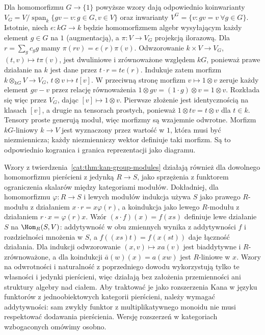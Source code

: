 \begin{przyklad}
Dla homomorfizmu $G\to\{1\}$ powyższe wzory dają odpowiednio koinwarianty $V_G=V/\operatorname{span}_k\{gv-v:g\in G,v\in V\}$ oraz inwarianty $V^G=\{v:gv=v\ \forall g\in G\}$. Istotnie, niech $e:kG\to k$ będzie homomorfizmem algebr wysyłającym każdy element $g\in G$ na $1$ (augmentacją), a $\pi:V\to V_G$ projekcją ilorazową. Dla $r=\sum_g c_g g$ mamy $\pi(rv)=e(r)\pi(v)$. Odwzorowanie $k\times V\to V_G$, $(t,v)\mapsto t\pi(v)$, jest dwuliniowe i zrównoważone względem $kG$, ponieważ prawe działanie na $k$ jest dane przez $t\cdot r=te(r)$. Indukuje zatem morfizm $k\otimes_{kG}V\to V_G$, $t\otimes v\mapsto t[v]$. W przeciwną stronę morfizm $v\mapsto1\otimes v$ zeruje każdy element $gv-v$ przez relację równoważenia $1\otimes gv=(1\cdot g)\otimes v=1\otimes v$. Rozkłada się więc przez $V_G$, dając $[v]\mapsto1\otimes v$. Pierwsze złożenie jest identycznością na klasach $[v]$, a drugie na tensorach prostych, ponieważ $1\otimes tv=t\otimes v$ dla $t\in k$. Tensory proste generują moduł, więc morfizmy są wzajemnie odwrotne. Morfizm $kG$-liniowy $k\to V$ jest wyznaczony przez wartość w $1$, która musi być niezmiennicza; każdy niezmienniczy wektor definiuje taki morfizm. Są to odpowiednio kogranica i granica reprezentacji jako diagramu.
\end{przyklad}
\begin{uwaga}
Wzory z twierdzenia~\ref{cat:thm:kan-group-modules} działają również dla dowolnego homomorfizmu pierścieni z jedynką $R\to S$, jako sprzężenia z funktorem ograniczenia skalarów między kategoriami modułów. Dokładniej, dla homomorfizmu $\varphi:R\to S$ i lewych modułów indukcja używa $S$ jako prawego $R$-modułu z działaniem $x\cdot r=x\varphi(r)$, a koindukcja jako lewego $R$-modułu z działaniem $r\cdot x=\varphi(r)x$. Wzór $(s\cdot f)(x)=f(xs)$ definiuje lewe działanie $S$ na $\Hom_R(S,V)$: addytywność w obu zmiennych wynika z addytywności $f$ i rozdzielności mnożenia w $S$, a $f((xs)t)=f(x(st))$ daje łączność działania. Dla indukcji odwzorowanie $(x,v)\mapsto xa(v)$ jest biaddytywne i $R$-zrównoważone, a dla koindukcji $\bar a(w)(x)=a(xw)$ jest $R$-liniowe w $x$. Wzory na odwrotności i naturalność z poprzedniego dowodu wykorzystują tylko te własności i jedynki pierścieni, więc działają bez założenia przemienności ani struktury algebry nad ciałem. Aby traktować je jako rozszerzenia Kana w języku funktorów z jednoobiektowych kategorii pierścieni, należy wymagać addytywności: sam zwykły funktor z multiplikatywnego monoidu nie musi respektować dodawania pierścienia. Wersję rozszerzeń w kategoriach wzbogaconych omówimy osobno.
\end{uwaga}

